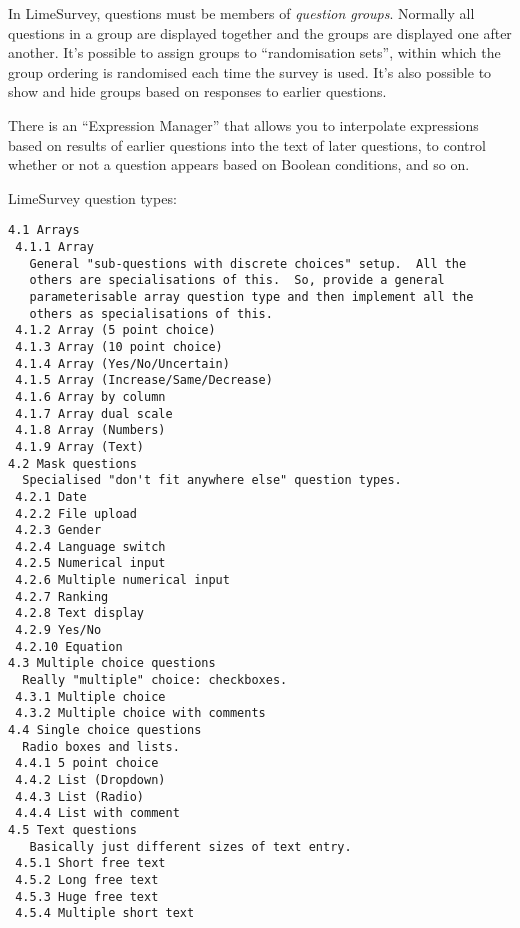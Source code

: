 \documentclass[DIV=calc,paper=a4,fontsize=11pt]{scrartcl}
\begin{document}
In LimeSurvey, questions must be members of \emph{question groups}.
Normally all questions in a group are displayed together and the
groups are displayed one after another.  It's possible to assign
groups to ``randomisation sets'', within which the group ordering is
randomised each time the survey is used.  It's also possible to show
and hide groups based on responses to earlier questions.

There is an ``Expression Manager'' that allows you to interpolate
expressions based on results of earlier questions into the text of
later questions, to control whether or not a question appears based on
Boolean conditions, and so on.

LimeSurvey question types:

\begin{Verbatim}
4.1 Arrays
 4.1.1 Array
   General "sub-questions with discrete choices" setup.  All the
   others are specialisations of this.  So, provide a general
   parameterisable array question type and then implement all the
   others as specialisations of this.
 4.1.2 Array (5 point choice)
 4.1.3 Array (10 point choice)
 4.1.4 Array (Yes/No/Uncertain)
 4.1.5 Array (Increase/Same/Decrease)
 4.1.6 Array by column
 4.1.7 Array dual scale
 4.1.8 Array (Numbers)
 4.1.9 Array (Text)
4.2 Mask questions
  Specialised "don't fit anywhere else" question types.
 4.2.1 Date
 4.2.2 File upload
 4.2.3 Gender
 4.2.4 Language switch
 4.2.5 Numerical input
 4.2.6 Multiple numerical input
 4.2.7 Ranking
 4.2.8 Text display
 4.2.9 Yes/No
 4.2.10 Equation
4.3 Multiple choice questions
  Really "multiple" choice: checkboxes.
 4.3.1 Multiple choice
 4.3.2 Multiple choice with comments
4.4 Single choice questions
  Radio boxes and lists.
 4.4.1 5 point choice
 4.4.2 List (Dropdown)
 4.4.3 List (Radio)
 4.4.4 List with comment
4.5 Text questions
   Basically just different sizes of text entry.
 4.5.1 Short free text
 4.5.2 Long free text
 4.5.3 Huge free text
 4.5.4 Multiple short text
\end{Verbatim}
\end{document}
